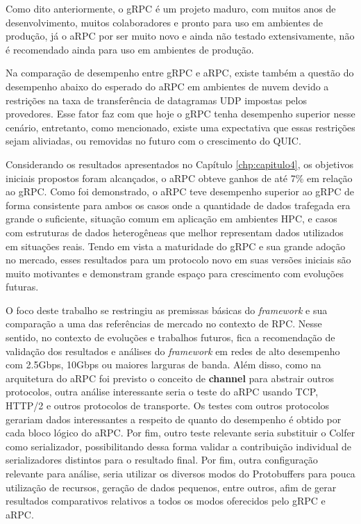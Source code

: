 Como dito anteriormente, o gRPC é um projeto maduro, com muitos anos de desenvolvimento, muitos colaboradores e pronto para uso em ambientes de produção, já o aRPC por ser muito novo e ainda não testado extensivamente, não é recomendado ainda para uso em ambientes de produção.

Na comparação de desempenho entre gRPC e aRPC, existe também a questão do desempenho abaixo do esperado do aRPC em ambientes de nuvem devido a restrições na taxa de transferência de datagramas UDP impostas pelos provedores. Esse fator faz com que hoje o gRPC tenha desempenho superior nesse cenário, entretanto, como mencionado, existe uma expectativa que essas restrições sejam aliviadas, ou removidas no futuro com o crescimento do QUIC.

Considerando os resultados apresentados no Capítulo \ref{chp:capitulo4}, os objetivos iniciais propostos foram alcançados, o aRPC obteve ganhos de até 7\% em relação ao gRPC. Como foi demonstrado, o aRPC teve desempenho superior ao gRPC de forma consistente para ambos os casos onde a quantidade de dados trafegada era grande o suficiente, situação comum em aplicação em ambientes HPC, e casos com estruturas de dados heterogêneas que melhor representam dados utilizados em situações reais. Tendo em vista a maturidade do gRPC e sua grande adoção no mercado, esses resultados para um protocolo novo em suas versões iniciais são muito motivantes e demonstram grande espaço para crescimento com evoluções futuras. 

O foco deste trabalho se restringiu as premissas básicas do \textit{framework} e sua comparação a uma das referências de mercado no contexto de RPC. Nesse sentido, no contexto de evoluções e trabalhos futuros, fica a recomendação de validação dos resultados e análises do \textit{framework} em redes de alto desempenho com 2.5Gbps, 10Gbps ou maiores larguras de banda. Além disso, como na arquitetura do aRPC foi previsto o conceito de \textbf{channel} para abstrair outros protocolos, outra análise interessante seria o teste do aRPC usando TCP, HTTP/2 e outros protocolos de transporte. Os testes com outros protocolos gerariam dados interessantes a respeito de quanto do desempenho é obtido por cada bloco lógico do aRPC. Por fim, outro teste relevante seria substituir o Colfer como serializador, possibilitando dessa forma validar a contribuição individual de serializadores distintos para o resultado final. Por fim, outra configuração relevante para análise, seria utilizar os diversos modos do Protobuffers para pouca utilização de recursos, geração de dados pequenos, entre outros, afim de gerar resultados comparativos relativos a todos os modos oferecidos pelo gRPC e aRPC.

